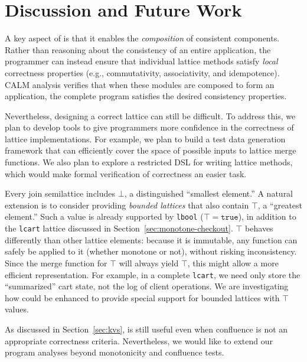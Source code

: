 \section{Discussion and Future Work}
\label{sec:discussion}
A key aspect of \lang is that it enables the \emph{composition} of consistent
components. Rather than reasoning about the consistency of an entire
application, the programmer can instead ensure that individual lattice methods
satisfy \emph{local} correctness properties (e.g., commutativity, associativity,
and idempotence). CALM analysis verifies that when these modules are composed to
form an application, the complete program satisfies the desired consistency
properties.

Nevertheless, designing a correct lattice can still be difficult. To address
this, we plan to develop tools to give programmers more confidence in the
correctness of lattice implementations. For example, we plan to build a test
data generation framework that can efficiently cover the space of possible
inputs to lattice merge functions. We also plan to explore a restricted DSL for
writing lattice methods, which would make formal verification of correctness an
easier task.

Every join semilattice includes $\bot$, a distinguished ``smallest element.'' A
natural extension is to consider providing \emph{bounded lattices} that also
contain $\top$, a ``greatest element.'' Such a value is already supported by
\texttt{lbool} ($\top = \mathtt{true}$), in addition to the \texttt{lcart}
lattice discussed in Section~\ref{sec:monotone-checkout}. $\top$ behaves
differently than other lattice elements: because it is immutable, any function
can safely be applied to it (whether monotone or not), without risking
inconsistency. Since the merge function for $\top$ will always yield $\top$,
this might allow a more efficient representation.  For example, in a complete
\texttt{lcart}, we need only store the ``summarized'' cart state, not the log of
client operations. We are investigating how \lang could be enhanced to provide
special support for bounded lattices with $\top$ values.

As discussed in Section~\ref{sec:kvs}, \lang is still useful even when
confluence is not an appropriate correctness criteria. Nevertheless, we would
like to extend our program analyses beyond monotonicity and confluence tests.


